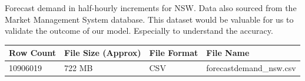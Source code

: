 \documentclass[mstat,12pt]{unswthesis}
\begin{document}
Forecast demand in half-hourly increments for NSW. Data also sourced
from the Market Management System database. This dataset would be
valuable for us to validate the outcome of our model. Especially to
understand the accuracy.

\begin{table}[h]
\tiny
\begin{tabular}{@{}|l|l|l|l|@{}}
\toprule
\textbf{Row Count} & \textbf{File Size (Approx)} & \textbf{File Format} & \textbf{File Name}      \\ \midrule
10906019           & 722 MB                      & CSV                  & forecastdemand\_nsw.csv \\ \bottomrule
\end{tabular}
\end{table}
\end{document}
